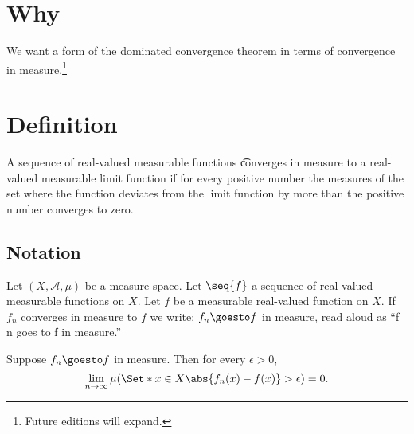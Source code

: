 

\section*{Why}

We want a form of the dominated convergence theorem in terms of convergence in measure.\footnote{Future editions will expand.}

\section*{Definition}

A sequence of real-valued measurable functions \t{converges in measure} to a real-valued measurable limit function if for every positive number the measures of the set where the function deviates from the limit function by more than the positive number converges to zero.

\subsection*{Notation}

Let $(X, \mathcal{A} , \mu )$ be a measure space.
Let $\seq{f}$ a sequence of real-valued measurable functions on $X$.
Let $f$ be a measurable real-valued function on $X$.
If $f_n$ converges in measure to $f$ we write: $f_n \goesto f$ in measure, read aloud as ``f n goes to f in measure.''

Suppose $f_n \goesto f$ in measure.
Then for every $\epsilon  > 0$,
\[
\lim_{n \to \infty} \mu (\Set*{x \in X}{\abs{f_n(x) - f(x)} > \epsilon }) = 0.
\]

\blankpage